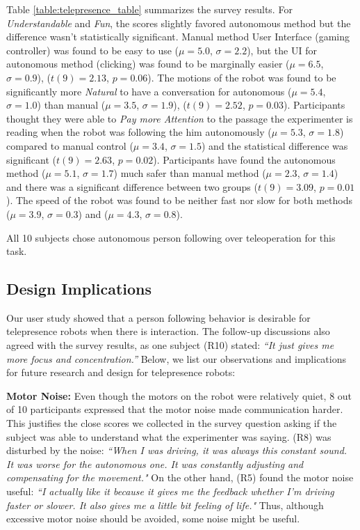 Table \ref{table:telepresence_table} summarizes the survey results. For \emph{Understandable} and \emph{Fun}, the scores slightly favored autonomous method but the difference wasn't statistically significant. Manual method User Interface (gaming controller) was found to be easy to use ($\mu=5.0$, $\sigma=2.2$), but the UI for autonomous method (clicking) was found to be marginally easier ($\mu=6.5$, $\sigma=0.9$), ($t(9)=2.13$, $p=0.06$). The motions of the robot was found to be significantly more \emph{Natural} to have a conversation for autonomous ($\mu=5.4$, $\sigma=1.0$) than manual ($\mu=3.5$, $\sigma=1.9$), ($t(9)=2.52$, $p=0.03$). Participants thought they were able to \emph{Pay more Attention} to the passage the experimenter is reading when the robot was following the him autonomously ($\mu=5.3$, $\sigma=1.8$) compared to manual control ($\mu=3.4$, $\sigma=1.5$) and the statistical difference was significant ($t(9)=2.63$, $p=0.02$). Participants have found the autonomous method ($\mu=5.1$, $\sigma=1.7$) much safer than manual method ($\mu=2.3$, $\sigma=1.4$) and there was a significant difference between two groups ($t(9)=3.09$, $p=0.01$). The speed of the robot was found to be neither fast nor slow for both methods ($\mu=3.9$, $\sigma=0.3$) and ($\mu=4.3$, $\sigma=0.8$).

All 10 subjects chose autonomous person following over teleoperation for this task.




\subsection{Design Implications}

Our user study showed that a person following behavior is desirable for telepresence robots when there is interaction. The follow-up discussions also agreed with the survey results, as one subject (R10) stated: \emph{``It just gives me more focus and concentration.''} Below, we list our observations and implications for future research and design for telepresence robots:

\textbf{Motor Noise:} Even though the motors on the robot were relatively quiet, 8 out of 10 participants expressed that the motor noise made communication harder. This justifies the close scores we collected in the survey question asking if the subject was able to understand what the experimenter was saying. (R8) was disturbed by the noise: \emph{``When I was driving, it was always this constant sound. It was worse for the autonomous one. It was constantly adjusting and compensating for the movement."} On the other hand, (R5) found the motor noise useful: \emph{``I actually like it because it gives me the feedback whether I'm driving faster or slower. It also gives me a little bit feeling of life."} Thus, although excessive motor noise should be avoided, some noise might be useful.


